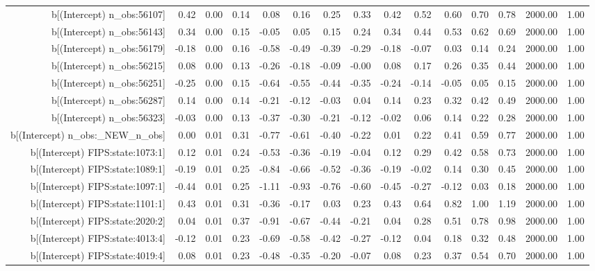 \begin{table}[ht]
\begin{tabular}{rrrrrrrrrrrrrrr}
  b[(Intercept) n\_obs:56107] & 0.42 & 0.00 & 0.14 & 0.08 & 0.16 & 0.25 & 0.33 & 0.42 & 0.52 & 0.60 & 0.70 & 0.78 & 2000.00 & 1.00 \\ 
  b[(Intercept) n\_obs:56143] & 0.34 & 0.00 & 0.15 & -0.05 & 0.05 & 0.15 & 0.24 & 0.34 & 0.44 & 0.53 & 0.62 & 0.69 & 2000.00 & 1.00 \\ 
  b[(Intercept) n\_obs:56179] & -0.18 & 0.00 & 0.16 & -0.58 & -0.49 & -0.39 & -0.29 & -0.18 & -0.07 & 0.03 & 0.14 & 0.24 & 2000.00 & 1.00 \\ 
  b[(Intercept) n\_obs:56215] & 0.08 & 0.00 & 0.13 & -0.26 & -0.18 & -0.09 & -0.00 & 0.08 & 0.17 & 0.26 & 0.35 & 0.44 & 2000.00 & 1.00 \\ 
  b[(Intercept) n\_obs:56251] & -0.25 & 0.00 & 0.15 & -0.64 & -0.55 & -0.44 & -0.35 & -0.24 & -0.14 & -0.05 & 0.05 & 0.15 & 2000.00 & 1.00 \\ 
  b[(Intercept) n\_obs:56287] & 0.14 & 0.00 & 0.14 & -0.21 & -0.12 & -0.03 & 0.04 & 0.14 & 0.23 & 0.32 & 0.42 & 0.49 & 2000.00 & 1.00 \\ 
  b[(Intercept) n\_obs:56323] & -0.03 & 0.00 & 0.13 & -0.37 & -0.30 & -0.21 & -0.12 & -0.02 & 0.06 & 0.14 & 0.22 & 0.28 & 2000.00 & 1.00 \\ 
  b[(Intercept) n\_obs:\_NEW\_n\_obs] & 0.00 & 0.01 & 0.31 & -0.77 & -0.61 & -0.40 & -0.22 & 0.01 & 0.22 & 0.41 & 0.59 & 0.77 & 2000.00 & 1.00 \\ 
  b[(Intercept) FIPS:state:1073:1] & 0.12 & 0.01 & 0.24 & -0.53 & -0.36 & -0.19 & -0.04 & 0.12 & 0.29 & 0.42 & 0.58 & 0.73 & 2000.00 & 1.00 \\ 
  b[(Intercept) FIPS:state:1089:1] & -0.19 & 0.01 & 0.25 & -0.84 & -0.66 & -0.52 & -0.36 & -0.19 & -0.02 & 0.14 & 0.30 & 0.45 & 2000.00 & 1.00 \\ 
  b[(Intercept) FIPS:state:1097:1] & -0.44 & 0.01 & 0.25 & -1.11 & -0.93 & -0.76 & -0.60 & -0.45 & -0.27 & -0.12 & 0.03 & 0.18 & 2000.00 & 1.00 \\ 
  b[(Intercept) FIPS:state:1101:1] & 0.43 & 0.01 & 0.31 & -0.36 & -0.17 & 0.03 & 0.23 & 0.43 & 0.64 & 0.82 & 1.00 & 1.19 & 2000.00 & 1.00 \\ 
  b[(Intercept) FIPS:state:2020:2] & 0.04 & 0.01 & 0.37 & -0.91 & -0.67 & -0.44 & -0.21 & 0.04 & 0.28 & 0.51 & 0.78 & 0.98 & 2000.00 & 1.00 \\ 
  b[(Intercept) FIPS:state:4013:4] & -0.12 & 0.01 & 0.23 & -0.69 & -0.58 & -0.42 & -0.27 & -0.12 & 0.04 & 0.18 & 0.32 & 0.48 & 2000.00 & 1.00 \\ 
  b[(Intercept) FIPS:state:4019:4] & 0.08 & 0.01 & 0.23 & -0.48 & -0.35 & -0.20 & -0.07 & 0.08 & 0.23 & 0.37 & 0.54 & 0.70 & 2000.00 & 1.00 \\ 

\end{tabular}
\end{table}
